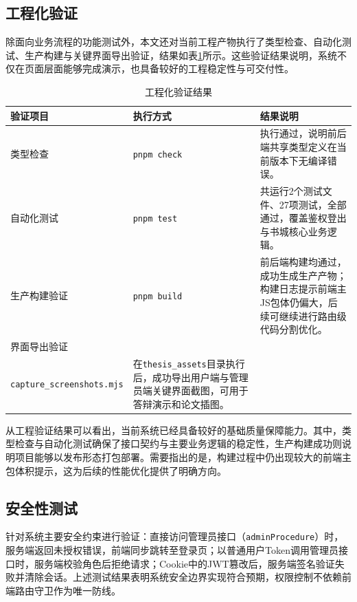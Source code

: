 \documentclass[12pt,a4paper]{ctexart}
\begin{document}
\subsection{工程化验证}

除面向业务流程的功能测试外，本文还对当前工程产物执行了类型检查、自动化测试、生产构建与关键界面导出验证，结果如表\ref{tab:engineering-checks}所示。这些验证结果说明，系统不仅在页面层面能够完成演示，也具备较好的工程稳定性与可交付性。

\begin{table}[H]
  \centering
  \caption{工程化验证结果}
  \label{tab:engineering-checks}
  \small
  \begin{tabularx}{\textwidth}{p{2.8cm} p{3.8cm} X}
    \toprule
    验证项目 & 执行方式 & 结果说明 \\
    \midrule
    类型检查 & \texttt{pnpm check} & 执行通过，说明前后端共享类型定义在当前版本下无编译错误。 \\
    自动化测试 & \texttt{pnpm test} & 共运行2个测试文件、27项测试，全部通过，覆盖鉴权登出与书城核心业务逻辑。 \\
    生产构建验证 & \texttt{pnpm build} & 前后端构建均通过，成功生成生产产物；构建日志提示前端主JS包体仍偏大，后续可继续进行路由级代码分割优化。 \\
    界面导出验证 & \shortstack[l]{\texttt{node}\\\texttt{capture\_screenshots.mjs}} & 在\texttt{thesis\_assets}目录执行后，成功导出用户端与管理员端关键界面截图，可用于答辩演示和论文插图。 \\
    \bottomrule
  \end{tabularx}
\end{table}

从工程验证结果可以看出，当前系统已经具备较好的基础质量保障能力。其中，类型检查与自动化测试确保了接口契约与主要业务逻辑的稳定性，生产构建成功则说明项目能够以发布形态打包部署。需要指出的是，构建过程中仍出现较大的前端主包体积提示，这为后续的性能优化提供了明确方向。

\subsection{安全性测试}

针对系统主要安全约束进行验证：直接访问管理员接口（\texttt{adminProcedure}）时，服务端返回未授权错误，前端同步跳转至登录页；以普通用户Token调用管理员接口时，服务端校验角色后拒绝请求；Cookie中的JWT篡改后，服务端签名验证失败并清除会话。上述测试结果表明系统安全边界实现符合预期，权限控制不依赖前端路由守卫作为唯一防线。
\end{document}
